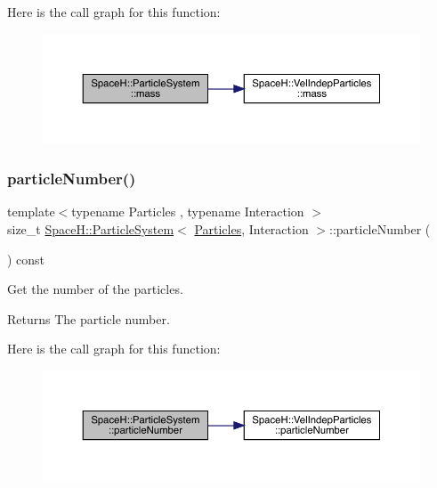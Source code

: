 Here is the call graph for this function\+:
\nopagebreak
\begin{figure}[H]
\begin{center}
\leavevmode
\includegraphics[width=350pt]{class_space_h_1_1_particle_system_a406f5aba5be8f379d0f1422997e9bf16_cgraph}
\end{center}
\end{figure}
\mbox{\label{class_space_h_1_1_particle_system_aebcc8ea132ff3e1c97713328fa8b0d4a}} 
\subsubsection{\texorpdfstring{particle\+Number()}{particleNumber()}}
{\footnotesize\ttfamily template$<$typename Particles , typename Interaction $>$ \\
size\+\_\+t \mbox{\hyperlink{class_space_h_1_1_particle_system}{Space\+H\+::\+Particle\+System}}$<$ \mbox{\hyperlink{struct_space_h_1_1_particles}{Particles}}, Interaction $>$\+::particle\+Number (\begin{DoxyParamCaption}{ }\end{DoxyParamCaption}) const\hspace{0.3cm}{\ttfamily [inline]}}



Get the number of the particles. 

\begin{DoxyReturn}{Returns}
The particle number. 
\end{DoxyReturn}
Here is the call graph for this function\+:
\nopagebreak
\begin{figure}[H]
\begin{center}
\leavevmode
\includegraphics[width=350pt]{class_space_h_1_1_particle_system_aebcc8ea132ff3e1c97713328fa8b0d4a_cgraph}
\end{center}
\end{figure}
\mbox{\label{class_space_h_1_1_particle_system_a6106365f497255a761789a37cd3f6ea6}} 
